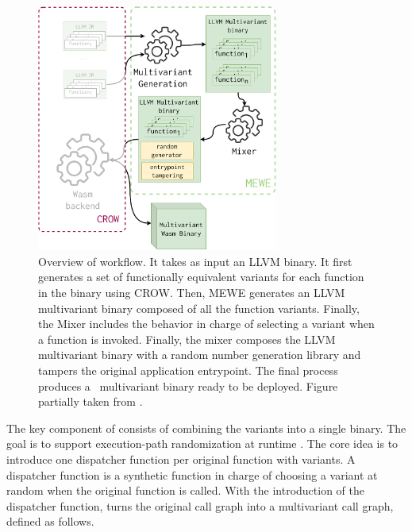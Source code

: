 \begin{figure}
  \centering
  \includegraphics[height=3.2in]{diagrams/MEWE.pdf}
  \caption{Overview of \tool workflow. It takes as input an LLVM binary. It first generates a set of functionally equivalent variants for each function in the binary using CROW. Then, MEWE generates an LLVM multivariant binary composed of all the function variants. Finally, the Mixer includes the behavior in charge of selecting a variant when a function is invoked. Finally, the \tool mixer composes the LLVM multivariant binary with a random number generation library and tampers the original application entrypoint. The final process produces a \wasm\ multivariant binary ready to be deployed. Figure partially taken from \cite{Lic}. }
  \label{workflow}
\end{figure}


 


The key component of \tool consists of combining the variants into a single binary.
The goal is to support execution-path randomization at runtime \cite{davi2015isomeron}.
The core idea is to introduce one dispatcher function per original function with variants.
A dispatcher function is a synthetic function in charge of choosing a variant at random when the original function is called.
With the introduction of the dispatcher function,  \tool turns the original call graph into a multivariant call graph, defined as follows. 


